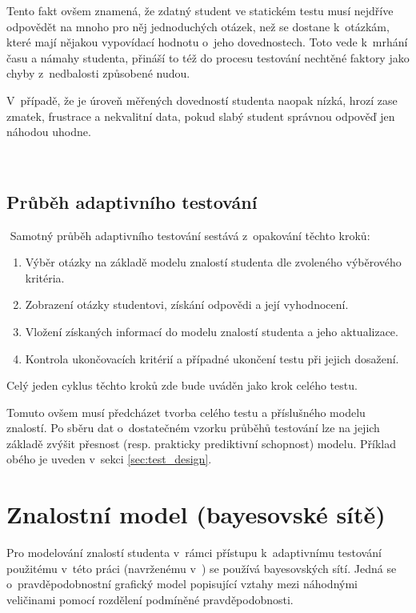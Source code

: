 \documentclass[a4paper,twoside,12pt]{scrbook}
\begin{document}
Tento fakt ovšem znamená, že zdatný student ve statickém testu musí nejdříve odpovědět na mnoho pro něj jednoduchých otázek, než se dostane k~otázkám, které mají nějakou vypovídací hodnotu o~jeho dovednostech. Toto vede k~mrhání času a námahy studenta, přináší to též do procesu testování nechtěné faktory jako chyby z~nedbalosti způsobené nudou.

V~případě, že je úroveň měřených dovedností studenta naopak nízká, hrozí zase zmatek, frustrace a nekvalitní data, pokud slabý student správnou odpověď jen náhodou uhodne.

 \subsection{Průběh adaptivního testování}
 Samotný průběh adaptivního testování sestává z~opakování těchto kroků: \cite{plajner16}
\begin{enumerate}
	\item Výběr otázky na základě modelu znalostí studenta dle zvoleného výběrového kritéria.
	\item Zobrazení otázky studentovi, získání odpovědi a její vyhodnocení.
	\item Vložení získaných informací do modelu znalostí studenta a jeho aktualizace.
	\item Kontrola ukončovacích kritérií a případné ukončení testu při jejich dosažení.
\end{enumerate}
Celý jeden cyklus těchto kroků zde bude uváděn jako krok celého testu.

Tomuto ovšem musí předcházet tvorba celého testu a příslušného modelu znalostí. Po sběru dat o~dostatečném vzorku průběhů testování lze na jejich základě zvýšit přesnost (resp. prakticky prediktivní schopnost) modelu. Příklad obého je uveden v~sekci \ref{sec:test_design}. %
%



\section{Znalostní model (bayesovské sítě)}
Pro modelování znalostí studenta v~rámci přístupu k~adaptivnímu testování použitému v~této práci (navrženému v~\cite{almond_tlustospis}) se používá bayesovských sítí. Jedná se o~pravděpodobnostní grafický model popisující vztahy mezi náhodnými veličinami pomocí rozdělení podmíněné pravděpodobnosti.
\end{document}
